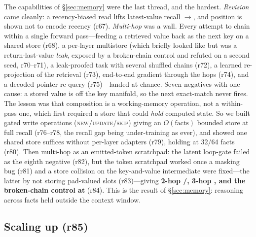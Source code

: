 The capabilities of \S\ref{sec:memory} were the last thread, and the hardest.
\emph{Revision} came cleanly: a recency-biased read lifts latest-value recall
$\to$, and position is shown not to encode recency (r67).
\emph{Multi-hop} was a wall. Every attempt to chain within a single forward
pass---feeding a retrieved value back as the next key on a shared store (r68), a
per-layer multistore (which briefly looked like  but was a
return-last-value \emph{leak}, exposed by a broken-chain control and refuted on a
second seed, r70--r71), a leak-proofed task with several shuffled chains (r72), a
learned re-projection of the retrieval (r73), end-to-end gradient through the hops
(r74), and a decoded-pointer re-query (r75)---landed at chance. Seven negatives with
one cause: a stored value is off the key manifold, so the next exact-match never fires.
The lesson was that composition is a working-memory operation, not a within-pass one,
which first required a store that could \emph{hold} computed state. So we built gated
write operations (\textsc{new}/\textsc{update}/\textsc{skip}) giving an
$O(\text{facts})$ bounded store at full recall (r76--r78, the recall gap being
under-training as ever), and showed one shared store suffices without per-layer
adapters (r79), holding at 32/64 facts (r80). Then multi-hop as an emitted-token
scratchpad: the latent loop-gate failed as the eighth negative (r82), but the token
scratchpad worked once a masking bug (r81) and a store collision on the
key-and-value intermediate were fixed---the latter by not storing pad-valued slots
(r83)---giving \textbf{2-hop /, 3-hop , and the
broken-chain control at } (r84). This is the result of \S\ref{sec:memory}:
reasoning across facts held outside the context window.

\subsection{Scaling up (r85)}

